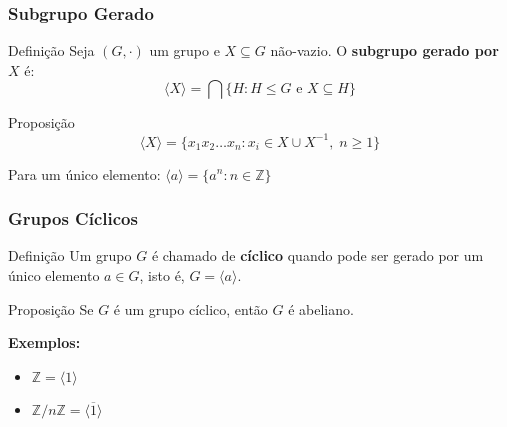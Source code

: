 \documentclass{beamer}
\begin{document}
\begin{frame}
\frametitle{Subgrupo Gerado}

\begin{block}{Definição}
Seja $(G, \cdot)$ um grupo e $X \subseteq G$ não-vazio. O \textbf{subgrupo gerado por $X$} é:
\[
\langle X \rangle = \bigcap \{H : H \leq G \text{ e } X \subseteq H\}
\]
\end{block}

\pause

\begin{exampleblock}{Proposição}
\[
\langle X \rangle = \{x_1 x_2 \ldots x_n : x_i \in X \cup X^{-1}, \; n \geq 1\}
\]
\end{exampleblock}

\pause

Para um único elemento: $\langle a \rangle = \{a^n : n \in \mathbb{Z}\}$

\end{frame}

\begin{frame}
\frametitle{Grupos Cíclicos}

\begin{block}{Definição}
Um grupo $G$ é chamado de \textbf{cíclico} quando pode ser gerado por um único elemento $a \in G$, isto é, $G = \langle a \rangle$.
\end{block}

\pause

\begin{exampleblock}{Proposição}
Se $G$ é um grupo cíclico, então $G$ é abeliano.
\end{exampleblock}

\pause

\textbf{Exemplos:}
\begin{itemize}
\item $\mathbb{Z} = \langle 1 \rangle$
\item $\mathbb{Z}/n\mathbb{Z} = \langle \overline{1} \rangle$
\end{itemize}

\end{frame}
\end{document}
